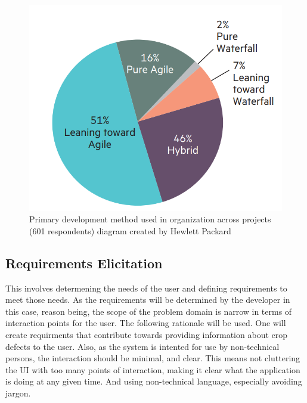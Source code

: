   \begin{figure}[H]
    \begin{center}
      \includegraphics[scale=0.4]{Images/PMMPieChart}
      \caption{Primary development method used in organization across projects (601 respondents) diagram created by Hewlett Packard}
      \label{fig:PMM_PieChart}
    \end{center}
  \end{figure}

  \subsection{Requirements Elicitation}
    This involves determening the needs of the user and defining requirements to meet those needs.
    As the requirements will be determined by the developer in this case, reason being, the scope of the problem domain is narrow in terms of interaction points for the user. The following rationale will be used.
    One will create requirments that contribute towards providing information about crop defects to the user.
    Also, as the system is intented for use by non-technical persons, the interaction should be minimal, and clear. This means not cluttering the UI with too many points of interaction, making it clear what the application is doing at any given time. And using non-technical language, especially avoiding jargon.
